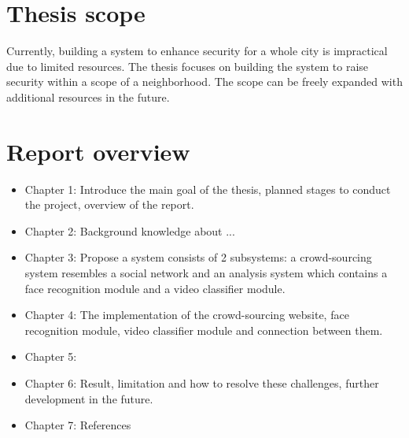 \section{Thesis scope}
Currently, building a system to enhance security for a whole city is impractical due to limited resources. The thesis focuses on building the system to raise security within a scope of a neighborhood. The scope can be freely expanded with additional resources in the future.
\section{Report overview}
\begin{itemize}
	\item Chapter 1: Introduce the main goal of the thesis, planned stages to conduct the project, overview of the report.
	\item Chapter 2: Background knowledge about ...
	\item Chapter 3: Propose a system consists of 2 subsystems: a crowd-sourcing system resembles a social network and an analysis system which contains a face recognition module and a video classifier module. 
	\item Chapter 4: The implementation of the crowd-sourcing website, face recognition module, video classifier module and connection between them.
	\item Chapter 5: 
	\item Chapter 6: Result, limitation and how to resolve these challenges, further development in the future.
	\item Chapter 7: References
\end{itemize} 
